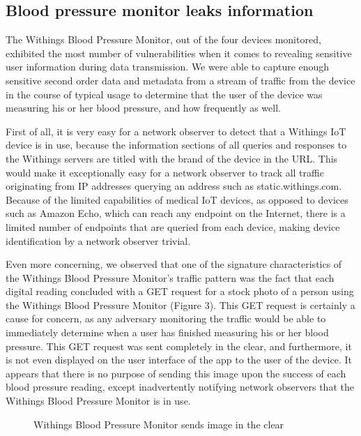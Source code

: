 \subsection{Blood pressure monitor leaks information}
The Withings Blood Pressure Monitor, out of the four devices monitored, exhibited the most number of vulnerabilities when it comes to revealing sensitive user information during data transmission. We were able to capture enough sensitive second order data and metadata from a stream of traffic from the device in the course of typical usage to determine that the user of the device was measuring his or her blood pressure, and how frequently as well. 

First of all, it is very easy for a network observer to detect that a Withings IoT device is in use, because the information sections of all queries and responses to the Withings servers are titled with the brand of the device in the URL. This would make it exceptionally easy for a network observer to track all traffic originating from IP addresses querying an address such as static.withings.com. Because of the limited capabilities of medical IoT devices, as opposed to devices such as Amazon Echo, which can reach any endpoint on the Internet, there is a limited number of endpoints that are queried from each device, making device identification by a network observer trivial.

Even more concerning, we observed that one of the signature characteristics of the Withings Blood Pressure Monitor's traffic pattern was the fact that each digital reading concluded with a GET request for a stock photo of a person using the Withings Blood Pressure Monitor (Figure 3). This GET request is certainly a cause for concern, as any adversary monitoring the traffic would be able to immediately determine when a user has finished measuring his or her blood pressure. This GET request was sent completely in the clear, and furthermore, it is not even displayed on the user interface of the app to the user of the device. It appears that there is no purpose of sending this image upon the success of each blood pressure reading, except inadvertently notifying network observers that the Withings Blood Pressure Monitor is in use. 

\begin{figure}
  \caption{Withings Blood Pressure Monitor sends image in the clear}
  \centering
\end{figure}

